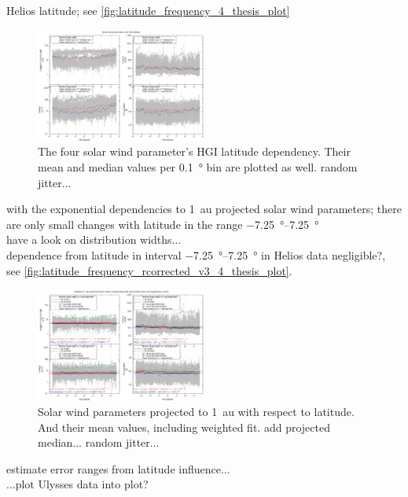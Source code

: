 Helios latitude; see \autoref{fig:latitude_frequency_4_thesis_plot}
\begin{figure}[htb]
	\centering
	\includegraphics[width=0.5\textwidth]{figures_of_mine/gnuplots/latitude_frequency_4_thesis_plot.png}
	\caption{The four solar wind parameter's HGI latitude dependency. Their mean and median values per \SI{0.1}{\degree} bin are plotted as well. random jitter...}
	\label{fig:latitude_frequency_4_thesis_plot}
\end{figure}

with the exponential dependencies to 1~au projected solar wind parameters; there are only small changes with latitude in the range \SIrange{-7.25}{7.25}{\degree}\\
have a look on distribution widths...\\

dependence from latitude in interval \SIrange{-7.25}{7.25}{\degree} in Helios data negligible?, see \autoref{fig:latitude_frequency_rcorrected_v3_4_thesis_plot}.\\
\begin{figure}[htb]
	\centering
	\includegraphics[width=0.5\textwidth]{figures_of_mine/gnuplots/latitude_frequency_rcorrected_v3_4_thesis_plot.png}
	\caption{Solar wind parameters projected to 1~au with respect to latitude. And their mean values, including weighted fit. add projected median... random jitter...}
	\label{fig:latitude_frequency_rcorrected_v3_4_thesis_plot}
\end{figure}
estimate error ranges from latitude influence...\\

...plot Ulysses data into plot?\\

